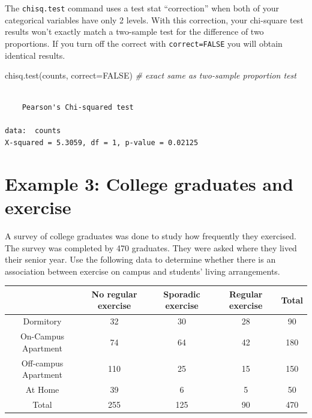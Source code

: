 \documentclass[
]{book}
\newenvironment{Shaded}{\begin{snugshade}}{\end{snugshade}}
\newcommand{\AttributeTok}[1]{\textcolor[rgb]{0.77,0.63,0.00}{#1}}
\newcommand{\CommentTok}[1]{\textcolor[rgb]{0.56,0.35,0.01}{\textit{#1}}}
\newcommand{\ConstantTok}[1]{\textcolor[rgb]{0.00,0.00,0.00}{#1}}
\newcommand{\FunctionTok}[1]{\textcolor[rgb]{0.00,0.00,0.00}{#1}}
\newcommand{\NormalTok}[1]{#1}
\begin{document}
The \texttt{chisq.test} command uses a test stat ``correction'' when both of your categorical variables have only 2 levels. With this correction, your chi-square test results won't exactly match a two-sample test for the difference of two proportions. If you turn off the correct with \texttt{correct=FALSE} you will obtain identical results.

\begin{Shaded}
\begin{Highlighting}[]
\FunctionTok{chisq.test}\NormalTok{(counts, }\AttributeTok{correct=}\ConstantTok{FALSE}\NormalTok{) }\CommentTok{\# exact same as two{-}sample proportion test}
\end{Highlighting}
\end{Shaded}

\begin{verbatim}

    Pearson's Chi-squared test

data:  counts
X-squared = 5.3059, df = 1, p-value = 0.02125
\end{verbatim}

\hypertarget{example-3-college-graduates-and-exercise}{%
\section{Example 3: College graduates and exercise}\label{example-3-college-graduates-and-exercise}}

A survey of college graduates was done to study how frequently they exercised. The survey was completed by 470 graduates. They were asked where they lived their senior year. Use the following data to determine whether there is an association between exercise on campus and students' living arrangements.

\begin{tabular}{|c|c|c|c|c|} \hline
 & No regular exercise & Sporadic exercise & Regular exercise & Total \\  \hline
Dormitory & 32 & 30 & 28 & 90  \\ \hline 
On-Campus Apartment & 74 & 64 & 42 & 180  \\ \hline 
Off-campus Apartment & 110 & 25 & 15 & 150 \\ \hline 
At Home & 39 & 6 & 5 &  50 \\ \hline 
Total & 255 & 125 & 90 & 470 \\ \hline 
\end{tabular}
\end{document}

